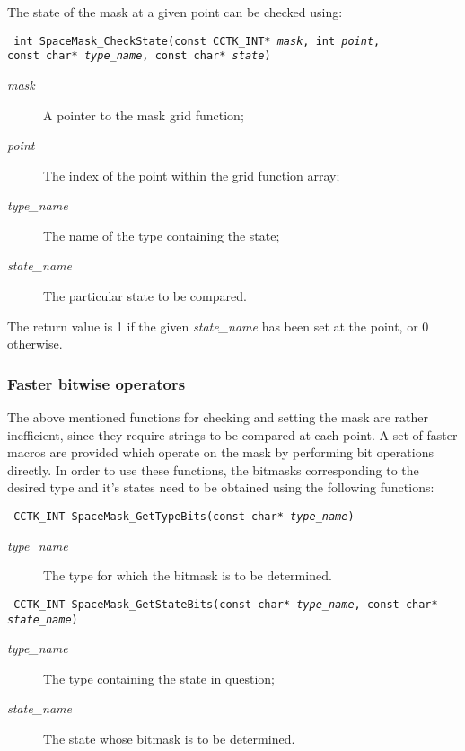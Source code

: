 \documentclass{article}
\begin{document}
The state of the mask at a given point can be checked using:

\indent\parbox{\linewidth}{
\vspace{\baselineskip}\noindent\texttt{
int SpaceMask\_CheckState(const CCTK\_INT* \emph{mask}, int \emph{point},
  \\\hspace*{10mm}
  const char* \emph{type\_name}, const char* \emph{state})
}\\
\hspace*{10mm}\parbox{\linewidth}{
\begin{description}
  \item[\emph{mask}] A pointer to the mask grid function;
  \item[\emph{point}] The index of the point within the grid function
    array;
  \item[\emph{type\_name}] The name of the type containing the state;
  \item[\emph{state\_name}] The particular state to be compared.
\end{description}
}}

The return value is 1 if the given \emph{state\_name} has been set at
the point, or 0 otherwise.

\subsubsection{Faster bitwise operators}

The above mentioned functions for checking and setting the mask are
rather inefficient, since they require strings to be compared at each
point. A set of faster macros are provided which operate on the mask
by performing bit operations directly. In order to use these
functions, the bitmasks corresponding to the desired type and it's
states need to be obtained using the following functions:

\indent\parbox{\linewidth}{
\vspace{\baselineskip}\noindent\texttt{
CCTK\_INT SpaceMask\_GetTypeBits(const char* \emph{type\_name})
}\\
\hspace*{10mm}\parbox{\linewidth}{
\begin{description}
  \item[\emph{type\_name}] The type for which the bitmask is to be
  determined.
\end{description}
}}

\indent\parbox{\linewidth}{
\vspace{\baselineskip}\noindent\texttt{
CCTK\_INT SpaceMask\_GetStateBits(const char* \emph{type\_name},
  const char* \emph{state\_name})
}
\hspace*{10mm}\parbox{\linewidth}{
\begin{description}
  \item[\emph{type\_name}] The type containing the state in question;
  \item[\emph{state\_name}] The state whose bitmask is to be determined.
\end{description}
}}
\end{document}
